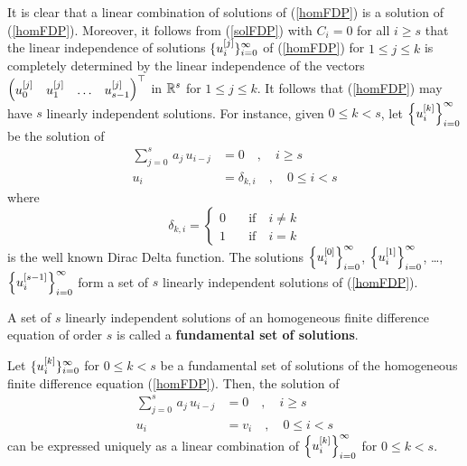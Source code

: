 It is clear that a linear combination of solutions of
(\ref{homFDP}) is a solution of (\ref{homFDP}).  Moreover, it follows
from (\ref{solFDP}) with $C_i = 0$ for all $i \geq s$ that the linear
independence of solutions $\displaystyle \{ u_i^{[j]} \}_{i=0}^\infty$ of
(\ref{homFDP}) for $1 \leq j \leq k$ is completely determined by the
linear independence of the vectors
$\displaystyle \begin{pmatrix} u_0^{[j]} & u_1^{[j]} & \ldots &
u_{s-1}^{[j]} \end{pmatrix}^\top$ in $\mathbb{R}^s$ for $1 \leq j \leq k$.
It follows that (\ref{homFDP}) may have $s$ linearly independent
solutions.  For instance, given $0 \leq k < s$, let
$\displaystyle \left\{ u_i^{[k]} \right\}_{i=0}^\infty$ be the solution of
\begin{align*}
\sum_{j=0}^s\,a_j\,u_{i-j} &= 0 \quad, \quad i \geq s \\
u_i &= \delta_{k,i} \quad, \quad 0 \leq i < s
\end{align*}
where
\[
\delta_{k,i} = \begin{cases}
0 & \quad \text{if} \quad i \neq k \\
1 & \quad \text{if} \quad i = k
\end{cases}
\]
is the well known Dirac Delta function.  The solutions
$\displaystyle \left\{ u_i^{[0]} \right\}_{i=0}^\infty$,
$\displaystyle \left\{ u_i^{[1]} \right\}_{i=0}^\infty$,
\ldots, $\displaystyle \left\{ u_i^{[s-1]} \right\}_{i=0}^\infty$
form a set of $s$ linearly independent solutions of (\ref{homFDP}).

\begin{defn}
A set of $s$ linearly independent solutions of an homogeneous finite
difference equation of order $s$ is called a
{\bfseries fundamental set of solutions}.
\end{defn}

\begin{theorem}
Let $\displaystyle \{ u_i^{[k]} \}_{i=0}^\infty$ for $0 \leq k < s$ be
a fundamental set of solutions of the homogeneous
finite difference equation (\ref{homFDP}).  Then, the solution of
\begin{align*}
\sum_{j=0}^s\,a_j\,u_{i-j} &= 0 \quad, \quad i \geq s \\
u_i &= v_i \quad, \quad 0 \leq i < s
\end{align*}
can be expressed uniquely as a linear combination of
$\displaystyle \left\{ u_i^{[k]} \right\}_{i=0}^\infty$ for $0 \leq k < s$.
\end{theorem}

